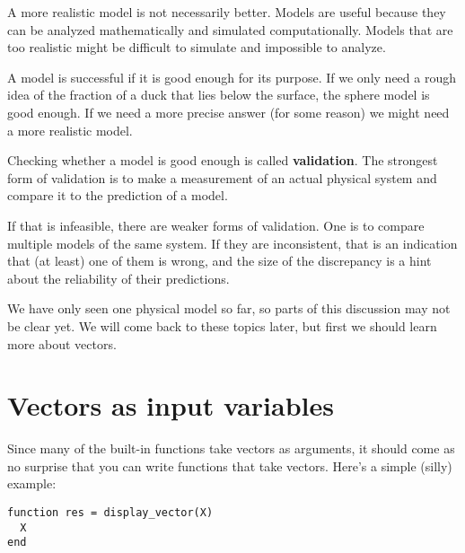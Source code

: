 A more realistic model is not necessarily better. Models are useful
because they can be analyzed mathematically and simulated
computationally. Models that are too realistic might be difficult to
simulate and impossible to analyze.

A model is successful if it is good enough for its purpose. If we
only need a rough idea of the fraction of a duck that lies below
the surface, the sphere model is good enough. If we need a more
precise answer (for some reason) we might need a more realistic
model.



Checking whether a model is good enough is called {\bf validation}.
The strongest form of validation is to make a measurement of an
actual physical system and compare it to the prediction of a
model.

If that is infeasible, there are weaker forms of validation. One is
to compare multiple models of the same system. If they are
inconsistent, that is an indication that (at least) one of them is
wrong, and the size of the discrepancy is a hint about the reliability
of their predictions.

We have only seen one physical model so far, so parts of this
discussion may not be clear yet. We will come back to these topics
later, but first we should learn more about vectors.



\section{Vectors as input variables}

Since many of the built-in functions take vectors as arguments,
it should come as no surprise that you can write functions that
take vectors. Here's a simple (silly) example:

\begin{verbatim}
function res = display_vector(X)
  X
end
\end{verbatim}

